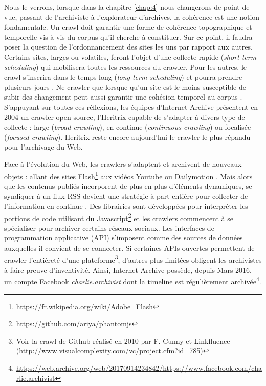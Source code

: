 \documentclass[symmetric,justified,marginals=raggedouter]{tufte-book}
\begin{document}
Nous le verrons, lorsque dans la chapitre \ref{chap:4} nous changerons de point de vue, passant de l'archiviste à l'explorateur d'archives, la cohérence est une notion fondamentale. Un crawl doit garantir une forme de cohérence topographique et temporelle vis à vis du corpus qu'il cherche à constituer. Sur ce point, il faudra poser la question de l'ordonnancement des sites les uns par rapport aux autres. Certains sites, larges ou volatiles, feront l'objet d'une collecte rapide (\textit{short-term scheduling}) qui mobilisera toutes les ressources du crawler.  Pour les autres, le crawl s'inscrira dans le temps long (\textit{long-term scheduling}) et pourra prendre plusieurs jours \citep{castillo_scheduling_2004}. Ne crawler que lorsque qu'un site est le moins susceptible de subir des changement peut aussi garantir une cohésion temporel au corpus \citep{saad_coherence-oriented_2011}. S'appuyant sur toutes ces réflexions, les équipes d'Internet Archive présentent en 2004 un crawler open-source, l'Heritrix \citep{mohr_introduction_2004} capable de s'adapter à divers type de collecte : large (\textit{broad crawling}), en continue (\textit{continuous crawling}) ou focalisée (\textit{focused crawling}). Heritrix reste encore aujourd'hui le crawler le plus répandu pour l'archivage du Web. 

Face à l'évolution du Web, les crawlers s'adaptent et archivent de nouveaux objets : allant des sites Flash\footnote{\url{https://fr.wikipedia.org/wiki/Adobe_Flash}} aux vidéos Youtube ou Dailymotion \citep{pop_archiving_2010}. Mais alors que les contenus publiés incorporent de plus en plus d'éléments dynamiques, se syndiquer à un flux RSS devient une stratégie à part entière pour collecter de l'information en continue \citep{oita_archiving_2010}. Des librairies sont développées pour interpréter les portions de code utilisant du Javascript\footnote{\url{https://github.com/ariya/phantomjs}} et les crawlers commencent à se spécialiser pour archiver certains réseaux sociaux. Les interfaces de programmation applicative (API) s'imposent comme des sources de données auxquelles il convient de se connecter. Si certaines APIs ouvertes permettent de crawler l'entièreté d'une plateforme\footnote{Voir la crawl de Github réalisé en 2010 par F. Cunny et Linkfluence (\url{http://www.visualcomplexity.com/vc/project.cfm?id=785})}, d'autres plus limitées obligent les archivistes à faire preuve d'inventivité. Ainsi, Internet Archive possède, depuis Mars 2016, un compte Facebook \textit{charlie.archivist} dont la timeline est régulièrement archivée\footnote{\url{https://web.archive.org/web/20170914234842/https://www.facebook.com/charlie.archivist}}. 
\end{document}
